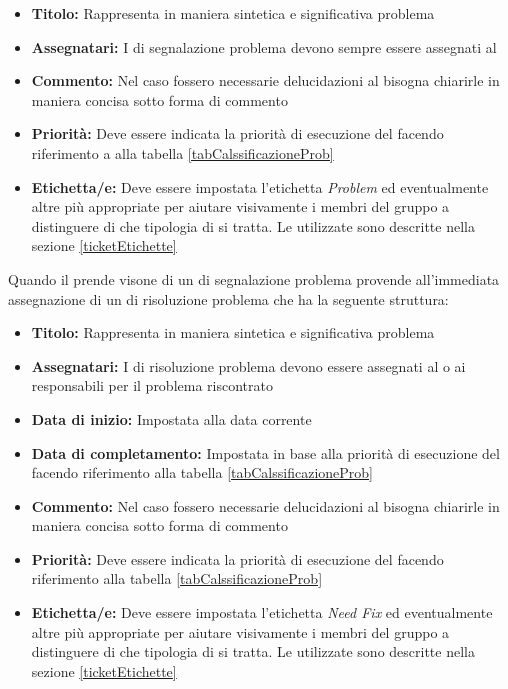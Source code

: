 \documentclass[12pt,a4paper]{article}
\begin{document}
\begin{itemize}
	\item \textbf{Titolo:} Rappresenta in maniera sintetica e significativa problema
	\item \textbf{Assegnatari:} I  di segnalazione problema devono sempre essere assegnati al \RE
	\item \textbf{Commento:} Nel caso fossero necessarie delucidazioni al  bisogna chiarirle in maniera concisa sotto forma di commento
	\item \textbf{Priorità:} Deve essere indicata la priorità di esecuzione del  facendo riferimento a alla tabella \ref{tabCalssificazioneProb}
	\item \textbf{Etichetta/e:} Deve essere impostata l'etichetta \textit{Problem} ed eventualmente altre  più appropriate  per aiutare visivamente i membri del gruppo a distinguere di che tipologia di  si tratta. Le  utilizzate sono descritte nella sezione \ref{ticketEtichette}
\end{itemize}

Quando il \RE{} prende visone di un  di segnalazione problema provende all'immediata assegnazione di un  di risoluzione problema che ha la seguente struttura:

\begin{itemize}
	\item \textbf{Titolo:} Rappresenta in maniera sintetica e significativa problema
	\item \textbf{Assegnatari:} I  di risoluzione problema devono essere assegnati al o ai responsabili per il problema riscontrato
	\item \textbf{Data di inizio:} Impostata alla data corrente
	\item \textbf{Data di completamento:} Impostata in base alla priorità di esecuzione del  facendo riferimento alla tabella \ref{tabCalssificazioneProb}
	\item \textbf{Commento:} Nel caso fossero necessarie delucidazioni al  bisogna chiarirle in maniera concisa sotto forma di commento
	\item \textbf{Priorità:} Deve essere indicata la priorità di esecuzione del  facendo riferimento alla tabella \ref{tabCalssificazioneProb}
	\item \textbf{Etichetta/e:} Deve essere impostata l'etichetta \textit{Need Fix} ed eventualmente altre  più appropriate  per aiutare visivamente i membri del gruppo a distinguere di che tipologia di  si tratta. Le  utilizzate sono descritte nella sezione \ref{ticketEtichette}
\end{itemize}
\end{document}
